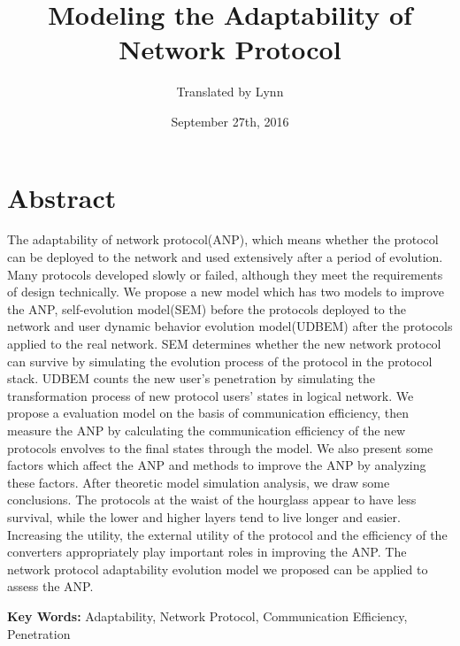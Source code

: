 \documentclass{article}
\title{Modeling the Adaptability of Network Protocol}
\author{Translated by Lynn }
\date{September 27th, 2016}
\begin{document}
\maketitle

\section*{Abstract}
The adaptability of network protocol(ANP), which means whether the protocol can be deployed to the network
and used extensively after a period of evolution. Many protocols developed slowly or failed, although they
meet the requirements of design technically. We propose a new model which has two models to improve the ANP,
self-evolution model(SEM) before the protocols deployed to the network and user dynamic behavior evolution
model(UDBEM) after the protocols applied to the real network. SEM determines whether the new network protocol
can survive by simulating the evolution process of the protocol in the protocol stack. UDBEM counts the new
user's penetration by simulating the transformation process of new protocol users' states in logical network.
We propose a evaluation model on the basis of communication efficiency, then measure the ANP by calculating
the communication efficiency of the new protocols envolves to the final states through the model. We also
present some factors which affect the ANP and methods to improve the ANP by analyzing these factors. After
theoretic model simulation analysis, we draw some conclusions. The protocols at the waist of the hourglass
appear to have less survival, while the lower and higher layers tend to live longer and easier. Increasing
the utility, the external utility of the protocol and the efficiency of the converters appropriately play
important roles in improving the ANP. The network protocol adaptability evolution model we proposed can be
applied to assess the ANP.

\setlength{\parskip}{0.5\baselineskip}
\par\noindent \textbf {Key Words:}
Adaptability, Network Protocol, Communication Efficiency, Penetration
\end{document}
